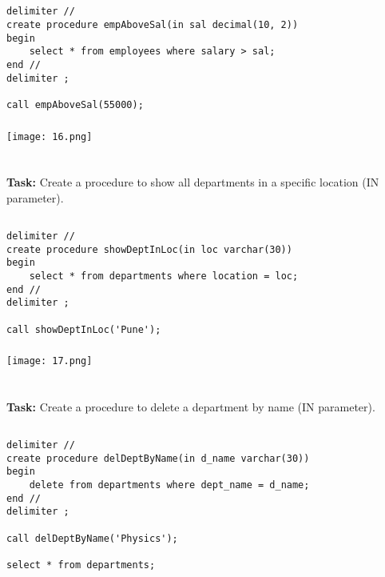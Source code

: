 \documentclass[12pt,a4paper]{article}
\begin{document}
\subsection{}
\begin{lstlisting}
delimiter //
create procedure empAboveSal(in sal decimal(10, 2))
begin
	select * from employees where salary > sal;
end //
delimiter ;

call empAboveSal(55000);
\end{lstlisting}

\subsubsection{}
\begin{center}
    \texttt{[image: 16.png]}
\end{center}


\section{}
\textbf{Task:} Create a procedure to show all departments in a specific location (IN parameter).

\subsection{}
\begin{lstlisting}
delimiter //
create procedure showDeptInLoc(in loc varchar(30))
begin
	select * from departments where location = loc;
end //
delimiter ;

call showDeptInLoc('Pune');
\end{lstlisting}

\subsubsection{}
\begin{center}
    \texttt{[image: 17.png]}
\end{center}


\section{}
\textbf{Task:} Create a procedure to delete a department by name (IN parameter).

\subsection{}
\begin{lstlisting}
delimiter //
create procedure delDeptByName(in d_name varchar(30))
begin
	delete from departments where dept_name = d_name;
end //
delimiter ;

call delDeptByName('Physics');

select * from departments;
\end{lstlisting}
\end{document}
